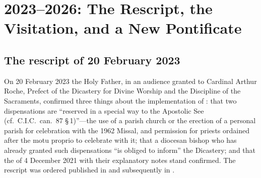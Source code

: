 \section{2023--2026: The Rescript, the Visitation, and a New Pontificate}

\subsection{The rescript of 20 February 2023}

On 20 February 2023 the Holy Father, in an audience granted to Cardinal
Arthur Roche, Prefect of the Dicastery for Divine Worship and the
Discipline of the Sacraments, confirmed three things about the
implementation of : that two dispensations are
``reserved in a special way to the Apostolic See (cf.\ C.I.C.\ can.\ 87
§\,1)''---the use of a parish church or the erection of a personal parish
for celebration with the 1962 Missal, and permission for priests ordained
after the motu proprio to celebrate with it; that a diocesan bishop who
has already granted such dispensations ``is obliged to inform'' the
Dicastery; and that the  of 4 December 2021 with
their explanatory notes stand confirmed. The rescript was ordered
published in  and subsequently in .

